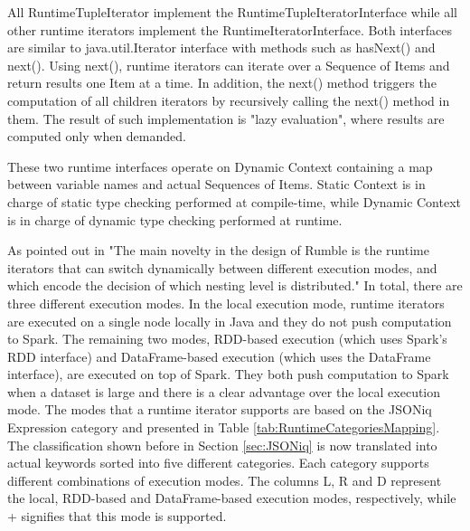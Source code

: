 All RuntimeTupleIterator implement the RuntimeTupleIteratorInterface while all other runtime iterators implement the RuntimeIteratorInterface. Both interfaces are similar to java.util.Iterator interface with methods such as hasNext() and next(). Using next(), runtime iterators can iterate over a Sequence of Items and return results one Item at a time. In addition, the next() method triggers the computation of all children iterators by recursively calling the next() method in them. The result of such implementation is "lazy evaluation", where results are computed only when demanded. 

These two runtime interfaces operate on Dynamic Context containing a map between variable names and actual Sequences of Items. Static Context is in charge of static type checking performed at compile-time, while Dynamic Context is in charge of dynamic type checking performed at runtime.

As pointed out in \cite{RumblePaper} "The main novelty in the design of Rumble is the runtime iterators that can switch dynamically between different execution modes, and which encode the decision of which nesting level is distributed." In total, there are three different execution modes. In the local execution mode, runtime iterators are executed on a single node locally in Java and they do not push computation to Spark. The remaining two modes, RDD-based execution (which uses Spark’s RDD interface) and  DataFrame-based execution (which uses the DataFrame interface), are executed on top of Spark. They both push computation to Spark when a dataset is large and there is a clear advantage over the local execution mode. The modes that a runtime iterator supports are based on the JSONiq Expression category and presented in Table \ref{tab:RuntimeCategoriesMapping}. The classification shown before in Section \ref{sec:JSONiq} is now translated into actual keywords sorted into five different categories. Each category supports different combinations of execution modes. The columns L, R and D represent the local, RDD-based and DataFrame-based execution modes, respectively, while + signifies that this mode is supported.

